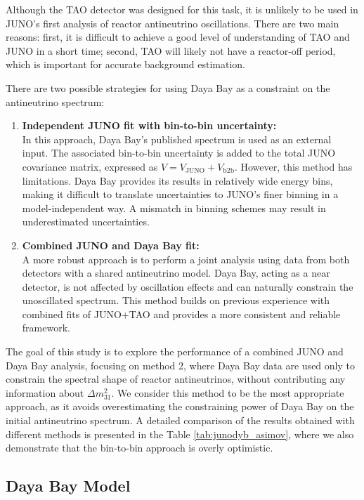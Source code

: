 Although the TAO detector was designed for this task, it is unlikely to be used in JUNO’s first
analysis of reactor antineutrino oscillations. There are two main reasons: first, it is difficult to
achieve a good level of understanding of TAO and JUNO in a short time; second, TAO will likely not
have a reactor-off period, which is important for accurate background estimation.

There are two possible strategies for using Daya Bay as a constraint on the antineutrino spectrum:
\begin{enumerate}
  \item \textbf{Independent JUNO fit with bin-to-bin uncertainty:} \\ In this
    approach, Daya Bay’s published spectrum is used as an external input. The associated bin-to-bin
    uncertainty is added to the total JUNO covariance matrix, expressed as $V = V_{\text{JUNO}} +
    V_{\text{b2b}}$. However, this method has limitations. Daya Bay provides its results in relatively
    wide energy bins, making it difficult to translate uncertainties to JUNO’s finer binning in a
    model-independent way. A mismatch in binning schemes may result in underestimated uncertainties.
  \item \textbf{Combined JUNO and Daya Bay fit:} \\ A more robust approach is to perform a joint
    analysis using data from both detectors with a shared antineutrino model. Daya Bay, acting as a
    near detector, is not affected by oscillation effects and can naturally constrain the
    unoscillated spectrum. This method builds on previous experience with combined fits of
    JUNO+TAO and provides a more consistent and reliable framework.
\end{enumerate}

The goal of this study is to explore the performance of a combined JUNO and Daya Bay analysis,
focusing on method 2, where Daya Bay data are used only to constrain the spectral shape of reactor
antineutrinos, without contributing any information about $\Delta m^2_{31}$. We consider this method to be the most appropriate approach, as it avoids overestimating the constraining power of Daya Bay on the initial antineutrino spectrum. A detailed comparison of the results obtained with different methods is presented in the Table \ref{tab:junodyb_asimov}, where we also demonstrate that the bin-to-bin approach is overly optimistic.

\subsection{Daya Bay Model}

